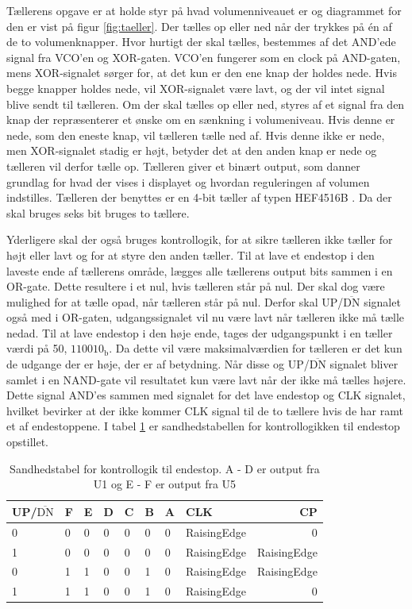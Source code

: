 Tællerens opgave er at holde styr på hvad volumenniveauet er og diagrammet for den er vist på figur \ref{fig:taeller}. Der tælles op eller ned når der trykkes på én af de to volumenknapper. Hvor hurtigt der skal tælles, bestemmes af det AND'ede signal fra VCO'en og XOR-gaten. VCO'en fungerer som en clock på AND-gaten, mens XOR-signalet sørger for, at det kun er den ene knap der holdes nede. Hvis begge knapper holdes nede, vil XOR-signalet være lavt, og der vil intet signal blive sendt til tælleren. Om der skal tælles op eller ned, styres af et signal fra den knap der repræsenterer et ønske om en sænkning i volumeniveau. Hvis denne er nede, som den eneste knap, vil tælleren tælle ned af. Hvis denne ikke er nede, men XOR-signalet stadig er højt, betyder det at den anden knap er nede og tælleren vil derfor tælle op. Tælleren giver et binært output, som danner grundlag for hvad der vises i displayet og hvordan reguleringen af volumen indstilles. Tælleren der benyttes er en 4-bit tæller af typen HEF4516B \cite{hef4516b-datablad}. Da der skal bruges seks bit bruges to tællere.

Yderligere skal der også bruges kontrollogik, for at sikre tælleren ikke tæller for højt eller lavt og for at styre den anden tæller. Til at lave et endestop i den laveste ende af tællerens område, lægges alle tællerens output bits sammen i en OR-gate. Dette resultere i et nul, hvis tælleren står på nul. Der skal dog være mulighed for at tælle opad, når tælleren står på nul. Derfor skal UP/$\overline{\mathrm{DN}}$ signalet også med i OR-gaten, udgangssignalet vil nu være lavt når tælleren ikke må tælle nedad. Til at lave endestop i den høje ende, tages der udgangspunkt i en tæller værdi på 50, $110010_\mathrm{b}$. Da dette vil være maksimalværdien for tælleren er det kun de udgange der er høje, der er af betydning. Når disse og UP/$\overline{\mathrm{DN}}$ signalet bliver samlet i en NAND-gate vil resultatet kun være lavt når der ikke må tælles højere. Dette signal AND'es sammen med signalet for det lave endestop og CLK signalet, hvilket bevirker at der ikke kommer CLK signal til de to tællere hvis de har ramt et af endestoppene. I tabel \ref{tab:taeller} er sandhedstabellen for kontrollogikken til endestop opstillet.

\begin{table}[h]
\centering
\begin{tabular}{|l|l|l|l|l|l|l|l||r|}
\hline
UP/$\overline{\mathrm{DN}}$ & F & E & D & C & B & A & CLK & CP \\ \hline
0 & 0 & 0 & 0 & 0 & 0 & 0 & RaisingEdge & 0 \\
1 & 0 & 0 & 0 & 0 & 0 & 0 & RaisingEdge & RaisingEdge \\
0 & 1 & 1 & 0 & 0 & 1 & 0 & RaisingEdge & RaisingEdge \\
1 & 1 & 1 & 0 & 0 & 1 & 0 & RaisingEdge & 0 \\
\hline
\end{tabular}
\caption{Sandhedstabel for kontrollogik til endestop. A - D er output fra U1 og E - F er output fra U5}
\label{tab:taeller}
\end{table}

